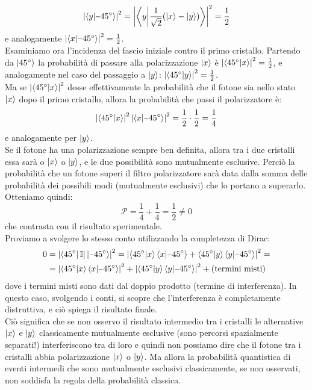 \documentclass[FisicaTeorica.tex]{subfiles}
\begin{document}
\[
\abs{\braket{y|\minus 45^\circ}}^2 = \abs{\left\langle y\bigg|\frac{1}{\sqrt{2}}(\ket{x}-\ket{y})\right\rangle}^2 = \frac{1}{2} 
\]
e analogamente $\abs{\braket{x|\minus 45^\circ}}^2 = \frac{1}{2}$.\\
Esaminiamo ora l'incidenza del fascio iniziale contro il primo cristallo. Partendo da $\ket{45^\circ}$ la probabilità di passare alla polarizzazione $\ket{x}$ è $\left|\braket{45^\circ |x}\right|^2 = \frac{1}{2}$, e analogamente nel caso del passaggio a $\ket{y}$: $\left|\braket{45^\circ|y}\right|^2=\frac{1}{2}$.\\
Ma se $\left|\braket{45^\circ |x}\right|^2$ desse effettivamente la probabilità che il fotone sia nello stato $\ket{x}$ dopo il primo cristallo, allora la probabilità che passi il polarizzatore è:
\[
\abs{\braket{45^\circ |x}}^2 \abs{\braket{{x}|\minus 45^\circ}}^2 = \frac{1}{2}\cdot \frac{1}{2} = \frac{1}{4}
\] %
e analogamente per $\ket{y}$.\\
Se il fotone ha una polarizzazione sempre ben definita, allora tra i due cristalli essa sarà o $\ket{x}$ o $\ket{y}$, e le due possibilità sono mutualmente esclusive.
Perciò la probabilità che un fotone superi il filtro polarizzatore sarà data dalla somma delle probabilità dei possibili modi (mutualmente esclusivi) che lo portano a superarlo. Otteniamo quindi:
\[
\mathcal{P} = \frac{1}{4} + \frac{1}{4} = \frac{1}{2} \neq 0
\]
che contrasta con il risultato sperimentale.\\
Proviamo a svolgere lo stesso conto utilizzando la completezza di Dirac:
\begin{align*}
0 &= \abs{\bra{45^\circ} \bb{I}|\ket{\minus 45^\circ}}^2 = \abs{\braket{45^\circ|x}\braket{x|\minus 45^\circ} + \braket{45^\circ|y}\braket{y|\minus 45^\circ}}^2 =\\
&= \abs{\braket{45^\circ|x}\braket{x|\minus 45^\circ}}^2 + \abs{\braket{45^\circ|y}\braket{y|\minus 45^\circ}}^2 + \text{(termini misti)}
\end{align*}
dove i termini misti sono dati dal doppio prodotto (termine di interferenza). In questo caso, svolgendo i conti, si scopre che l'interferenza è completamente distruttiva, e ciò spiega il risultato finale.\\
Ciò significa che se non osservo il risultato intermedio tra i cristalli le alternative $\ket{x}$ e $\ket{y}$ classicamente mutualmente esclusive (sono percorsi spazialmente separati!) interferiscono tra di loro e quindi non possiamo dire che il fotone tra i cristalli abbia polarizzazione $\ket{x}$ o $\ket{y}$. Ma allora la probabilità quantistica di eventi intermedi che sono mutualmente esclusivi classicamente, se non osservati, non soddisfa la regola della probabilità classica.\\
\end{document}
